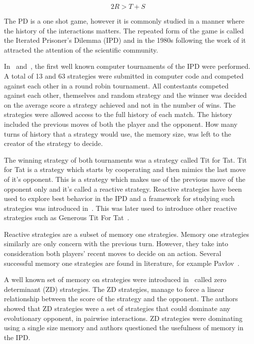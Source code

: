 \documentclass[10pt]{article}
\begin{document}
\begin{equation}\label{eq:pd_constrain_two}
    2R > T + S
\end{equation}

The PD is a one shot game, however it is commonly studied in a manner where the
history of the interactions matters. The repeated form of the game is called the
Iterated Prisoner's Dilemma (IPD) and in the 1980s following the work of
\cite{Axelrod1980a, Axelrod1980b} it attracted the attention of the scientific
community.

In~\cite{Axelrod1980a} and~\cite{Axelrod1980b}, the first well known computer
tournaments of the IPD were performed. A total of 13 and 63 strategies were submitted
in computer code and competed against each other in a round robin tournament.
All contestants competed against each other, themselves and random strategy and the
winner was decided on the average score a strategy achieved and not in the number of wins.
The strategies were allowed access to the full history of each match. The history
included the previous moves of both the player and the opponent. How many turns of history
that a strategy would use, the memory size, was left to the creator of the strategy to
decide.

The winning strategy of both tournaments was a strategy called Tit for Tat. Tit for Tat
is a strategy which starts by cooperating and then mimics the last move of
it's opponent. This is a strategy which makes use of the previous move of the opponent
only and it's called a reactive strategy. Reactive strategies have been used
to explore best behavior in the IPD and a framework for studying such strategies
was introduced in~\cite{Nowak1989}. This was later used to introduce other
reactive strategies such as Generous Tit For Tat~\cite{Nowak1990}.

Reactive strategies are a subset of memory one strategies. Memory one strategies
similarly are only concern with the previous turn. However, they take into consideration
both players' recent moves to decide on an action. Several successful memory one
strategies are found in literature, for example Pavlov~\cite{Nowak1993}.

A well known set of memory on strategies were introduced in~\cite{Press2012}
called zero determinant (ZD) strategies. The ZD strategies, manage to force a linear
relationship between the score of the strategy and the opponent. The authors showed
that ZD strategies were a set of strategies that could dominate any evolutionary
opponent, in pairwise interactions. ZD strategies were dominating using a single
size memory and authors questioned the usefulness of memory in the IPD.
\end{document}
